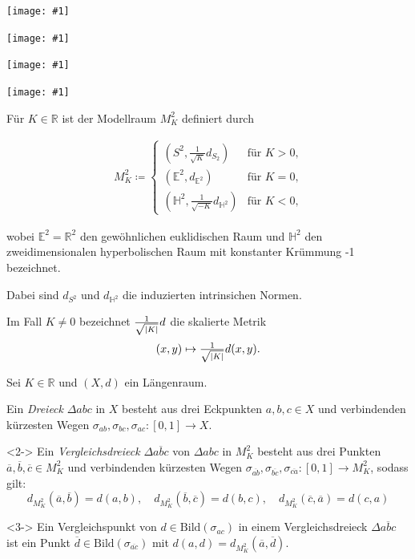 \documentclass{beamer}
\newcommand{\E}{\mathbb{E}} %
\newcommand{\R}{\mathbb{R}} %
\newcommand{\HH}{\mathbb{H}} %
\newcommand{\Bild}{\mathrm{Bild}} %
\DeclarePairedDelimiter\abs{\lvert}{\rvert}%
\theoremstyle{definition}
\newcommand{\framedgraphic}[1] {
  \begin{frame}
    \begin{center}
      \vspace{-10pt}
      \texttt{[image: \#1]}
    \end{center}
  \end{frame}
}
\begin{document}
\framedgraphic{bilder/sline-sm.jpg}
\framedgraphic{bilder/line2-ed.jpg}
\framedgraphic{bilder/line3-sm.jpg}
\framedgraphic{bilder/line4-sm.jpg}

\begin{frame}
  Für $K \in \R$ ist der Modellraum $M_K^2$ definiert durch

  \begin{align*}
    M_K^2 \coloneqq \begin{cases}
      (S^2, \tfrac{1}{\sqrt{K}} d_{S_2}) & \text{für $K > 0$,}\\
      (\E^2, d_{\E^2}) & \text{für $K = 0$,}\\
      (\HH^2, \tfrac{1}{\sqrt{-K}} d_{\HH^2}) & \text{für $K < 0$,}
    \end{cases}
  \end{align*}

  wobei $\E^2 = \R^2$ den gewöhnlichen euklidischen Raum und $\HH^2$ den zweidimensionalen hyperbolischen Raum mit konstanter Krümmung -1 bezeichnet.

  Dabei sind $d_{S^2}$ und $d_{\HH^2}$ die induzierten intrinsichen Normen.

  Im Fall $K \not= 0$ bezeichnet $\tfrac{1}{\sqrt{\abs{K}}} d$ die skalierte Metrik
  \[ (x, y) \mapsto \tfrac{1}{\sqrt{\abs{K}}} d(x, y). \]
\end{frame}


\begin{frame}
  Sei $K \in \R$ und $(X, d)$ ein Längenraum.

  \begin{definition}
    Ein \emph{Dreieck} $\Delta abc$ in $X$ besteht aus drei Eckpunkten $a, b, c \in X$ und verbindenden kürzesten Wegen $\sigma_{ab}, \sigma_{bc}, \sigma_{ac} : \left[0,1\right] \to X$.
  \end{definition}

  \begin{definition}<2->
    Ein \emph{Vergleichsdreieck} $\Delta \overline{abc}$ von $\Delta abc$ in $M_K^2$ besteht aus drei Punkten $\overline{a}, \overline{b}, \overline{c} \in M_K^2$ und verbindenden kürzesten Wegen $\sigma_{\overline{ab}}, \sigma_{\overline{bc}}, \sigma_{\overline{ca}} : \left[0,1\right] \to M_K^2$, sodass gilt:
    \[
      d_{M_K^2}(\overline{a}, \overline{b}) = d(a, b),
      \quad
      d_{M_K^2}(\overline{b}, \overline{c}) = d(b, c),
      \quad
      d_{M_K^2}(\overline{c}, \overline{a}) = d(c, a)
    \]
  \end{definition}

  \begin{definition}<3->
    Ein Vergleichspunkt von $d \in \Bild(\sigma_{ac})$ in einem Vergleichsdreieck $\Delta \overline{abc}$ ist ein Punkt $\overline{d} \in \Bild(\sigma_{\overline{ac}})$ mit $d(a, d) = d_{M_K^2}(\overline{a}, \overline{d})$.
  \end{definition}
\end{frame}
\end{document}
